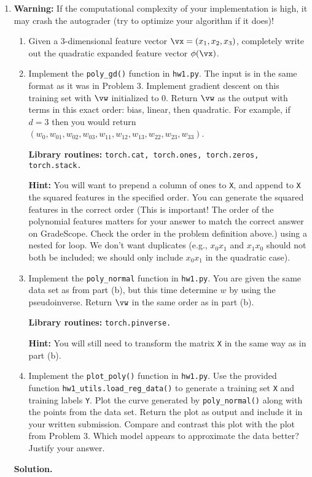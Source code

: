\documentclass{article}
\theoremstyle{definition}
\theoremstyle{remark}
\newenvironment{Q}
{%
  \clearpage
  \item
  }
  {%
    \phantom{s} %
    \bigskip
    \textbf{Solution.}
  }
\begin{document}
\begin{enumerate}[font={\Large\bfseries},left=0pt]
\begin{Q}
  \textbf{Warning:} If the computational complexity of your implementation is high, it may crash the autograder (try to optimize your algorithm if it does)!
  \begin{enumerate}
  \item Given a $3$-dimensional feature vector $\vx = (x_1,x_2,x_3)$, completely write out the quadratic expanded feature vector $\phi(\vx)$.
  \item Implement the \texttt{poly\_gd()} function in \texttt{hw1.py}.  The input is in the same format as it was in Problem 3.  Implement gradient descent on this training set with $\vw$ initialized to 0.  Return $\vw$ as the output with terms in this exact order: bias, linear, then quadratic.  For example, if $d = 3$ then you would return $(w_0, w_{01},w_{02},w_{03},w_{11},w_{12},w_{13},w_{22},w_{23},w_{33})$.
  
  \textbf{Library routines:} \texttt{torch.cat, torch.ones, torch.zeros, torch.stack.}
  
  \textbf{Hint:} You will want to prepend a column of ones to \texttt{X}, and append to \texttt{X} the squared features in the specified order. You can generate the squared features in the correct order (This is important! The order of the polynomial features matters for your answer to match the correct answer on GradeScope. Check the order in the problem definition above.) using a nested for loop. We don't want duplicates (e.g., $x_0 x_1$ and $x_1 x_0$ should not both be included; we should only include $x_0 x_1$ in the quadratic case).
  
  \item Implement the \texttt{poly\_normal} function in \texttt{hw1.py}.  You are given the same data set as from part (b), but this time determine $w$ by using the pseudoinverse.  Return $\vw$ in the same order as in part (b).
  
  \textbf{Library routines:} \texttt{torch.pinverse.}
  
  \textbf{Hint:} You will still need to transform the matrix \texttt{X} in the same way as in part (b).
  
  \item Implement the \texttt{plot\_poly()} function in \texttt{hw1.py}.  Use the provided function \texttt{hw1\_utils.load\_reg\_data()} to generate a training set \texttt{X} and training labels \texttt{Y}. Plot the curve generated by \texttt{poly\_normal()} along with the points from the data set.  Return the plot as output and include it in your written submission.  Compare and contrast this plot with the plot from Problem 3.  Which model appears to approximate the data better? Justify your answer.
  

\end{enumerate}
\end{Q}
\end{enumerate}
\end{document}
